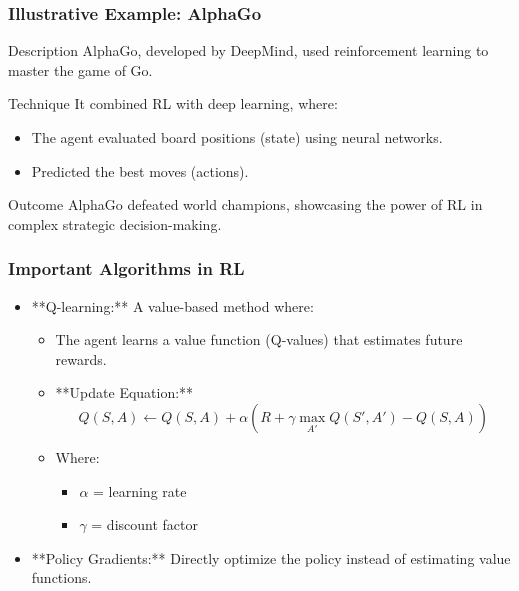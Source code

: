 \documentclass[aspectratio=169]{beamer}
\begin{document}
\begin{frame}[fragile]
    \frametitle{Illustrative Example: AlphaGo}
    \begin{block}{Description}
        AlphaGo, developed by DeepMind, used reinforcement learning to master the game of Go.
    \end{block}
    \begin{block}{Technique}
        It combined RL with deep learning, where:
        \begin{itemize}
            \item The agent evaluated board positions (state) using neural networks.
            \item Predicted the best moves (actions).
        \end{itemize}
    \end{block}
    \begin{block}{Outcome}
        AlphaGo defeated world champions, showcasing the power of RL in complex strategic decision-making.
    \end{block}
\end{frame}

\begin{frame}[fragile]
    \frametitle{Important Algorithms in RL}
    \begin{itemize}
        \item **Q-learning:** A value-based method where:
        \begin{itemize}
            \item The agent learns a value function (Q-values) that estimates future rewards.
            \item **Update Equation:** 
            \begin{equation}
                Q(S, A) \leftarrow Q(S, A) + \alpha \left( R + \gamma \max_{A'} Q(S', A') - Q(S, A) \right)
            \end{equation}
            \item Where:
            \begin{itemize}
                \item $\alpha$ = learning rate
                \item $\gamma$ = discount factor
            \end{itemize}
        \end{itemize}
        
        \item **Policy Gradients:** Directly optimize the policy instead of estimating value functions.
    \end{itemize}
\end{frame}
\end{document}
